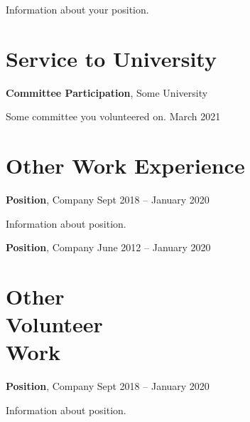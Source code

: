 \documentclass[margin,line]{res}
\newenvironment{basiclist}{
  \begin{list}{}{
      \setlength{\itemsep}{0.06in}
      \setlength{\parsep}{0in} 
      \setlength{\parskip}{0in}
      \setlength{\topsep}{0in} 
      \setlength{\partopsep}{0in} 
      \setlength{\rightmargin}{0in}
      \setlength{\leftmargin}{0in}
      }}{\end{list}
  }
\newenvironment{bullet-italic-right-stop}{
  \begin{list}{$\bullet$}{
      \setlength{\itemsep}{0.02in}
      \setlength{\parsep}{0in} 
      \setlength{\parskip}{0in}
      \setlength{\topsep}{0in} 
      \setlength{\partopsep}{0.025in} 
      \setlength{\rightmargin}{0.89in}
      \setlength{\leftmargin}{0.3in}
      \itshape
      }}{\end{list}
      \vspace*{-0.05in}
  }
\newenvironment{bullet-italic-no-right-stop}{
  \begin{list}{$\bullet$}{
      \setlength{\itemsep}{0.02in}
      \setlength{\parsep}{0in} 
      \setlength{\parskip}{0in}
      \setlength{\topsep}{0in} 
      \setlength{\partopsep}{0.025in} 
      \setlength{\rightmargin}{0in}
      \setlength{\leftmargin}{0.3in}
      \itshape
      }}{\end{list}
  }
\begin{document}
\begin{resume}
\begin{basiclist}
\begin{bullet-italic-right-stop}
\item Information about your position.
\end{bullet-italic-right-stop}

\end{basiclist}


\section{\sc Service to University}
\begin{basiclist}

\item \textbf{Committee Participation}, Some University

\begin{bullet-italic-no-right-stop}
\item Some committee you volunteered on. \hfill{\textnormal{March 2021}}
\end{bullet-italic-no-right-stop}

\end{basiclist}


\section{\sc Other Work Experience}

\begin{basiclist}

\item \textbf{Position}, Company \hfill {Sept 2018 -- January 2020} 

\begin{bullet-italic-right-stop}
\item Information about position.
\end{bullet-italic-right-stop}

\item \textbf{Position}, Company \hfill {June 2012 -- January 2020} 

\end{basiclist}

\section{\sc Other\\ Volunteer\\ Work}
\begin{basiclist}

\item \textbf{Position}, Company \hfill {Sept 2018 -- January 2020} 

\begin{bullet-italic-right-stop}
\item Information about position.
\end{bullet-italic-right-stop}

\end{basiclist}

\end{resume}
\end{document}
